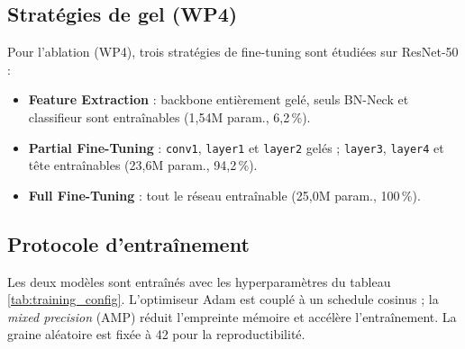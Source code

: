 \subsection{Stratégies de gel (WP4)}

Pour l'ablation (WP4), trois stratégies de fine-tuning sont étudiées sur ResNet-50 :

\begin{itemize}
\item \textbf{Feature Extraction} : backbone entièrement gelé, seuls BN-Neck et classifieur sont entraînables (1,54M param., 6,2\,\%).
\item \textbf{Partial Fine-Tuning} : \texttt{conv1}, \texttt{layer1} et \texttt{layer2} gelés ; \texttt{layer3}, \texttt{layer4} et tête entraînables (23,6M param., 94,2\,\%).
\item \textbf{Full Fine-Tuning} : tout le réseau entraînable (25,0M param., 100\,\%).
\end{itemize}

\subsection{Protocole d'entraînement}

Les deux modèles sont entraînés avec les hyperparamètres du tableau \ref{tab:training_config}. L'optimiseur Adam est couplé à un schedule cosinus ; la \textit{mixed precision} (AMP) réduit l'empreinte mémoire et accélère l'entraînement. La graine aléatoire est fixée à 42 pour la reproductibilité.

\begin{table}[t]
\centering
\caption{Hyperparamètres d'entraînement.}
\label{tab:training_config}
\end{table}

